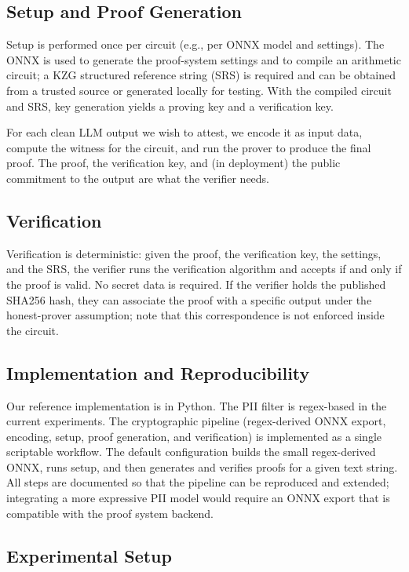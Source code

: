 \documentclass[10pt,conference,a4paper]{IEEEtran}
\begin{document}
\subsection{Setup and Proof Generation}

Setup is performed once per circuit (e.g., per ONNX model and settings). The ONNX is used to generate the proof-system settings and to compile an arithmetic circuit; a KZG structured reference string (SRS) is required and can be obtained from a trusted source or generated locally for testing. With the compiled circuit and SRS, key generation yields a proving key and a verification key.

For each clean LLM output we wish to attest, we encode it as input data, compute the witness for the circuit, and run the prover to produce the final proof. The proof, the verification key, and (in deployment) the public commitment to the output are what the verifier needs.

\subsection{Verification}

Verification is deterministic: given the proof, the verification key, the settings, and the SRS, the verifier runs the verification algorithm and accepts if and only if the proof is valid. No secret data is required. If the verifier holds the published SHA256 hash, they can associate the proof with a specific output under the honest-prover assumption; note that this correspondence is not enforced inside the circuit.

\subsection{Implementation and Reproducibility}

Our reference implementation is in Python. The PII filter is regex-based in the current experiments. The cryptographic pipeline (regex-derived ONNX export, encoding, setup, proof generation, and verification) is implemented as a single scriptable workflow. The default configuration builds the small regex-derived ONNX, runs setup, and then generates and verifies proofs for a given text string. All steps are documented so that the pipeline can be reproduced and extended; integrating a more expressive PII model would require an ONNX export that is compatible with the proof system backend.

\subsection{Experimental Setup}
\end{document}
